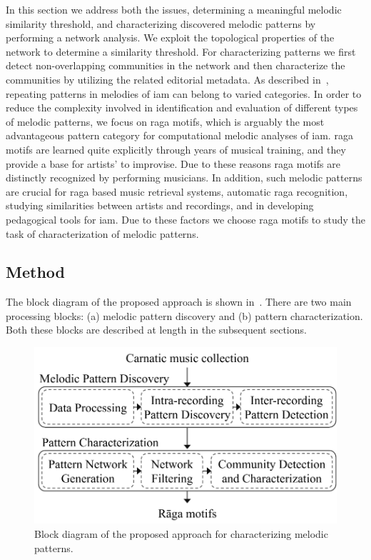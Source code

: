 {In this section we address both the issues, determining a meaningful melodic similarity threshold, and characterizing discovered melodic patterns by performing a network analysis. We exploit the topological properties of the network to determine a similarity threshold. For characterizing patterns we first detect non-overlapping communities in the network and then characterize the communities by utilizing the related editorial metadata. As described in~, repeating patterns in melodies of \gls{iam} can belong to varied categories. In order to reduce the complexity involved in identification and evaluation of different types of melodic patterns, we focus on \gls{raga} motifs, which is arguably the most advantageous pattern category for computational melodic analyses of \gls{iam}. \Gls{raga} motifs are learned quite explicitly through years of musical training, and they provide a base for artists' to improvise. Due to these reasons \gls{raga} motifs are distinctly recognized by performing musicians. In addition, such melodic patterns are crucial for \gls{raga} based music retrieval systems, automatic \gls{raga} recognition, studying similarities between artists and recordings, and in developing pedagogical tools for \gls{iam}. Due to these factors we choose \gls{raga} motifs to study the task of characterization of melodic patterns.  


\subsection{Method}

The block diagram of the proposed approach is shown in~. There are two main processing blocks: (a) melodic pattern discovery and (b) pattern characterization. Both these blocks are described at length in the subsequent sections.

\begin{figure}
	\begin{center}
		\includegraphics[width=\figSizeSeventy]{ch06_patterns/figures/Characterization/blockDiagram.pdf}
	\end{center}
	\caption{Block diagram of the proposed approach for characterizing melodic patterns.}
	\label{fig:block_diagram_characterization}
\end{figure}


}
